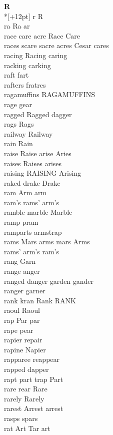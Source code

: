 \vspace{14pt}
\noindent\textbf{\Large R}\\*[+12pt]
r R\\
ra Ra ar\\
race care acre Race Care\\
races scare sacre acres Cesar cares\\
racing Racing caring\\
racking carking\\
raft fart\\
rafters fratres\\
ragamuffins RAGAMUFFINS\\
rage gear\\
ragged Ragged dagger\\
rags Rags\\
railway Railway\\
rain Rain\\
raise Raise arise Aries\\
raises Raises arises\\
raising RAISING Arising\\
raked drake Drake\\
ram Arm arm\\
ram's rams' arm's\\
ramble marble Marble\\
ramp pram\\
ramparts armstrap\\
rams Mars arms mars Arms\\
rams' arm's ram's\\
rang Garn\\
range anger\\
ranged danger garden gander\\
ranger garner\\
rank kran Rank RANK\\
raoul Raoul\\
rap Par par\\
rape pear\\
rapier repair\\
rapine Napier\\
rapparee reappear\\
rapped dapper\\
rapt part trap Part\\
rare rear Rare\\
rarely Rarely\\
rarest Arrest arrest\\
rasps spars\\
rat Art Tar art\\
